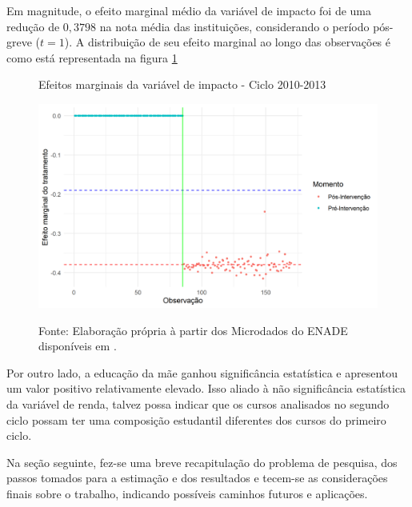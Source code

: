 Em magnitude, o efeito marginal médio da variável de impacto foi de uma redução de $0,3798$ na nota média das instituições, considerando o período pós-greve ($t = 1$). A distribuição de seu efeito marginal ao longo das observações é como está representada na figura \ref{fig:Efeitos_marginais_2010_2013}

\begin{figure}[H]
	\centering
	\caption{Efeitos marginais da variável de impacto - Ciclo 2010-2013}
	\label{fig:Efeitos_marginais_2010_2013}
	\includegraphics[width=0.7\linewidth]{"Figuras/Efeitos_marginais_2010_2013.png"} \\
\caption*{\RaggedRight Fonte: Elaboração própria à partir dos Microdados do ENADE disponíveis em \cite{INEP2020}.}
\end{figure}

Por outro lado, a educação da mãe ganhou significância estatística e apresentou um valor positivo relativamente elevado. Isso aliado à não significância estatística da variável de renda, talvez possa indicar que os cursos analisados no segundo ciclo possam ter uma composição estudantil diferentes dos cursos do primeiro ciclo.

Na seção seguinte, fez-se uma breve recapitulação do problema de pesquisa, dos passos tomados para a estimação e dos resultados e tecem-se as considerações finais sobre o trabalho, indicando possíveis caminhos futuros e aplicações.

\newpage 


